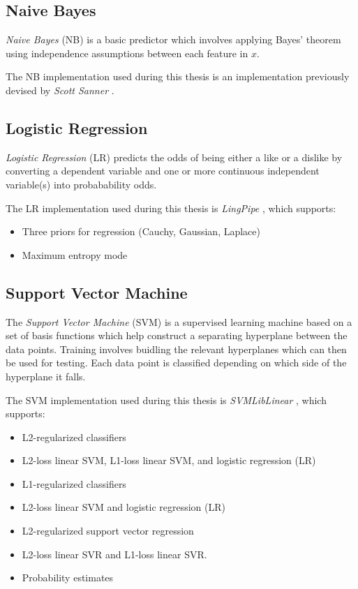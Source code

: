 \subsection{Naive Bayes}
\label{sec:nb}

\emph{Naive Bayes} (NB) is a basic predictor which involves applying Bayes' theorem using independence assumptions between each feature in $x$.

The NB implementation used during this thesis is an implementation previously devised by \emph{Scott Sanner} \cite{scott}.

\subsection{Logistic Regression}
\label{sec:lr}

\emph{Logistic Regression} (LR) predicts the odds of being either a like or a dislike by converting a dependent variable and one or more continuous 
independent variable(s) into probabability odds.

The LR implementation used during this thesis is \emph{LingPipe} \cite{lin}, which supports:
\begin{itemize}
\item Three priors for regression (Cauchy, Gaussian, Laplace)
\item Maximum entropy mode
\end{itemize}

\subsection{Support Vector Machine}
\label{sec:svm}

The \emph{Support Vector Machine} (SVM) is a supervised learning machine based on a set of basis functions which help construct a separating 
hyperplane between the data points. Training involves buidling the relevant hyperplanes which can then be used for testing. Each data point is
classified depending on which side of the hyperplane it falls.

The SVM implementation used during this thesis is \emph{SVMLibLinear} \cite{cjlin}, which supports:
\begin{itemize}
\item L2-regularized classifiers
\item L2-loss linear SVM, L1-loss linear SVM, and logistic regression (LR)
\item L1-regularized classifiers
\item L2-loss linear SVM and logistic regression (LR)
\item L2-regularized support vector regression
\item L2-loss linear SVR and L1-loss linear SVR.
\item Probability estimates
\end{itemize}

